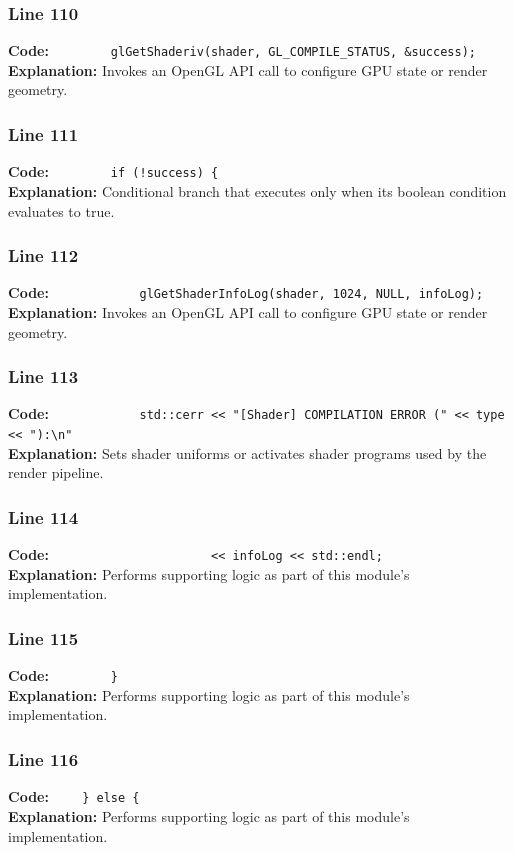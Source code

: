 \documentclass[11pt,a4paper]{article}
\begin{document}
\subsubsection*{Line 110}
\textbf{Code:} \verb|        glGetShaderiv(shader, GL_COMPILE_STATUS, &success);|\\
\textbf{Explanation:} Invokes an OpenGL API call to configure GPU state or render geometry.

\subsubsection*{Line 111}
\textbf{Code:} \verb|        if (!success) {|\\
\textbf{Explanation:} Conditional branch that executes only when its boolean condition evaluates to true.

\subsubsection*{Line 112}
\textbf{Code:} \verb|            glGetShaderInfoLog(shader, 1024, NULL, infoLog);|\\
\textbf{Explanation:} Invokes an OpenGL API call to configure GPU state or render geometry.

\subsubsection*{Line 113}
\textbf{Code:} \verb|            std::cerr << "[Shader] COMPILATION ERROR (" << type << "):\n"|\\
\textbf{Explanation:} Sets shader uniforms or activates shader programs used by the render pipeline.

\subsubsection*{Line 114}
\textbf{Code:} \verb|                      << infoLog << std::endl;|\\
\textbf{Explanation:} Performs supporting logic as part of this module's implementation.

\subsubsection*{Line 115}
\textbf{Code:} \verb|        }|\\
\textbf{Explanation:} Performs supporting logic as part of this module's implementation.

\subsubsection*{Line 116}
\textbf{Code:} \verb|    } else {|\\
\textbf{Explanation:} Performs supporting logic as part of this module's implementation.
\end{document}
